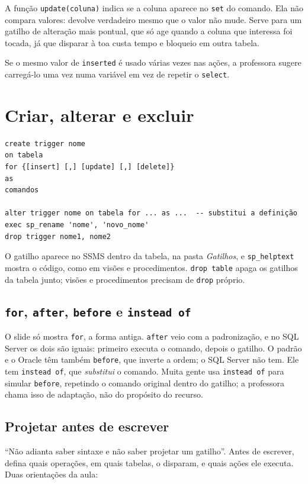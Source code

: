 A função \texttt{update(coluna)} indica se a coluna aparece no
\texttt{set} do comando. Ela não compara valores: devolve verdadeiro
mesmo que o valor não mude. Serve para um gatilho de alteração mais
pontual, que só age quando a coluna que interessa foi tocada, já que
disparar à toa custa tempo e bloqueio em outra tabela.

Se o mesmo valor de \texttt{inserted} é usado várias vezes nas ações,
a professora sugere carregá-lo uma vez numa variável em vez de repetir o
\texttt{select}.

\section{Criar, alterar e excluir}

\begin{lstlisting}
create trigger nome
on tabela
for {[insert] [,] [update] [,] [delete]}
as
comandos

alter trigger nome on tabela for ... as ...  -- substitui a definição
exec sp_rename 'nome', 'novo_nome'
drop trigger nome1, nome2
\end{lstlisting}

O gatilho aparece no SSMS dentro da tabela, na pasta \emph{Gatilhos}, e
\texttt{sp\_helptext} mostra o código, como em visões e procedimentos.
\texttt{drop table} apaga os gatilhos da tabela junto; visões e
procedimentos precisam de \texttt{drop} próprio.

\subsection{\texttt{for}, \texttt{after}, \texttt{before} e
\texttt{instead of}}

O slide só mostra \texttt{for}, a forma antiga. \texttt{after} veio com
a padronização, e no SQL Server os dois são iguais: primeiro executa o
comando, depois o gatilho. O padrão e o Oracle têm também
\texttt{before}, que inverte a ordem; o SQL Server não tem. Ele tem
\texttt{instead of}, que \emph{substitui} o comando. Muita gente usa
\texttt{instead of} para simular \texttt{before}, repetindo o comando
original dentro do gatilho; a professora chama isso de adaptação, não do
propósito do recurso.

\subsection{Projetar antes de escrever}

``Não adianta saber sintaxe e não saber projetar um gatilho''. Antes de
escrever, defina quais operações, em quais tabelas, o disparam, e quais
ações ele executa. Duas orientações da aula:

